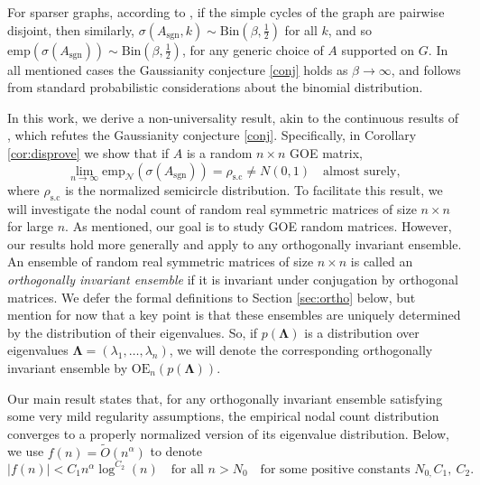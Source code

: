 \documentclass[reqno]{amsart}
\numberwithin{equation}{section}
\newcommand{\emp}{\mathrm{emp}}
\newcommand{\Nemp}{\mathrm{emp}_{\mathcal{N}}}
\begin{document}
For sparser graphs, according to \cite{alon2024nodal}, if the simple cycles of the graph are pairwise disjoint, then similarly, $\sigma(A_{\mathrm{sgn}},k)\sim \mathrm{Bin}(\beta,\tfrac{1}{2})$ for all $k$, and so $\emp(\sigma(A_{\mathrm{sgn}}))\sim \mathrm{Bin}(\beta,\tfrac{1}{2})$, for any generic choice of $A$ supported on $G$. In all mentioned cases the Gaussianity conjecture \ref{conj} holds as $\beta \to \infty$, and follows from standard probabilistic considerations about the binomial distribution.


In this work, we derive a non-universality result, akin to the continuous results of \cite{marinucci2016non,Nourdin2019}, which refutes the Gaussianity conjecture \ref{conj}. Specifically, in Corollary \ref{cor:disprove} we show that if $A$ is a random $n\times n$ GOE matrix,
\[ \lim_{n\to\infty}\Nemp(\sigma(A_{\mathrm{sgn}}))= \rho_{\mathrm{s.c}}\ne N(0,1)\quad\text{almost surely},\]
where $\rho_{\mathrm{s.c}}$ is the normalized semicircle distribution.
To facilitate this result, we will investigate the nodal count of random real symmetric matrices of size $n\times n$ for large $n$. As mentioned, our goal is to study GOE random matrices. However, our results hold more generally and apply to any orthogonally invariant ensemble. An ensemble of random real symmetric matrices of size $n\times n$ is called an \emph{orthogonally invariant ensemble} if it is invariant under conjugation by orthogonal matrices. We defer the formal definitions to Section \ref{sec:ortho} below, but mention for now that a key point is that these ensembles are uniquely determined by the distribution of their eigenvalues. So, if $p(\bm{\Lambda})$ is a distribution over eigenvalues $\bm{\Lambda}=(\lambda_{1},\ldots,\lambda_{n})$, we will denote the corresponding orthogonally invariant ensemble by $\mathrm{OE}_n(p(\bm{\Lambda}))$. 

Our main result states that, for any orthogonally invariant ensemble satisfying some very mild regularity assumptions, the empirical nodal count distribution converges to a properly normalized version of its eigenvalue distribution.
    Below, we use $f(n)=\tilde{O}(n^\alpha)$ to denote $$|f(n)|<C_1 n^{\alpha}\log^{C_{2}}(n)\quad\text{for all $n>N_0$}\quad\text{for some positive constants $N_{0,}C_{1},\ C_{2}$}.$$
\end{document}
